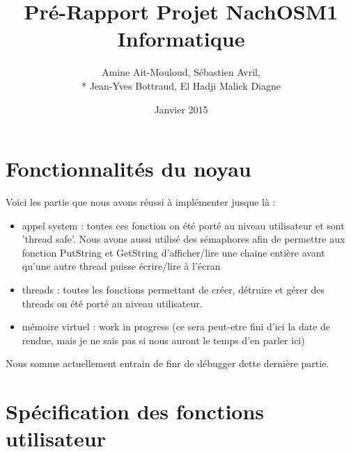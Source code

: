 \documentclass{article}
\begin{document}
\title {Pré-Rapport Projet NachOS\newline M1 Informatique}
\author{Amine Ait-Mouloud, Sébastien Avril,\\* Jean-Yves Bottraud, El Hadji Malick Diagne}
\date{Janvier 2015}
\maketitle

\tableofcontents

\section{Fonctionnalités du noyau}
	Voici les partie que nous avons réussi à implémenter jusque là :
	\begin{itemize}
		\item appel system : toutes ces fonction on été porté au niveau utilisateur et sont 'thread safe'. Nous avons aussi utilisé des sémaphores afin de permettre aux fonction PutString et GetString d'afficher/lire une chaine entière avant qu'une autre thread puisse écrire/lire à l'écran
		\item threads : toutes les fonctions permettant de créer, détruire et gérer des threads on été porté au niveau utilisateur.
		\item mémoire virtuel : work in progress (ce sera peut-etre fini d'ici la date de rendue, mais je ne sais pas si nous auront le temps d'en parler ici)
	\end{itemize}
	Nous somme actuellement entrain de finr de débugger dette dernière partie.

\section{Spécification des fonctions utilisateur}
\end{document}
